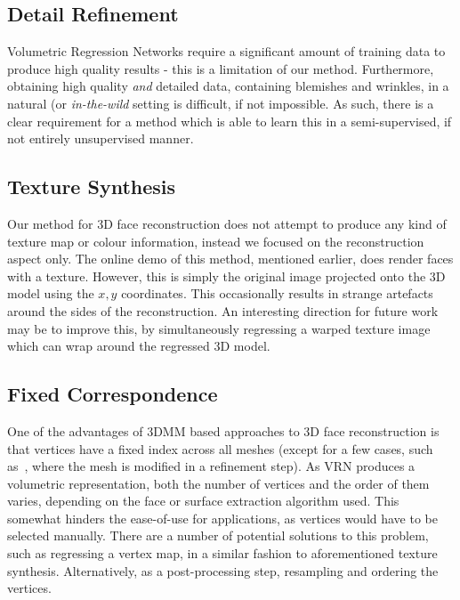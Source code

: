 \subsection{Detail Refinement} %

Volumetric Regression Networks require a significant amount of
training data to produce high quality results - this is a limitation
of our method. Furthermore, obtaining high quality \textit{and}
detailed data, containing blemishes and wrinkles, in a natural (or
\textit{in-the-wild} setting is difficult, if not impossible. As such,
there is a clear requirement for a method which is able to learn this
in a semi-supervised, if not entirely unsupervised manner.

\subsection{Texture Synthesis}

Our method for 3D face reconstruction does not attempt to produce any
kind of texture map or colour information, instead we focused on the
reconstruction aspect only. The online demo of this method, mentioned
earlier, does render faces with a texture. However, this is simply the
original image projected onto the 3D model using the $x,y$
coordinates. This occasionally results in strange artefacts around the
sides of the reconstruction. An interesting direction for future work
may be to improve this, by simultaneously regressing a warped texture
image which can wrap around the regressed 3D model.

\subsection{Fixed Correspondence}

One of the advantages of 3DMM based approaches to 3D face
reconstruction is that vertices have a fixed index across all meshes
(except for a few cases, such as~\cite{tran2018extreme}, where the
mesh is modified in a refinement step). As VRN produces a volumetric
representation, both the number of vertices and the order of them
varies, depending on the face or surface extraction algorithm
used. This somewhat hinders the ease-of-use for applications, as
vertices would have to be selected manually. There are a number of
potential solutions to this problem, such as regressing a vertex map,
in a similar fashion to aforementioned texture
synthesis. Alternatively, as a post-processing step, resampling and
ordering the vertices.


